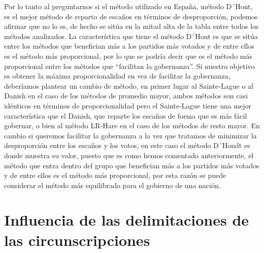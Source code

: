 \documentclass[12pt,a4paper,]{book}
\def\ifdoblecara{} %
\def\ifprincipal{} %
\numberwithin{dummy}{section}
\theoremstyle{ocrenumbox}
\theoremstyle{blacknumex}
\theoremstyle{blacknumbox}
\theoremstyle{ocrenum}
\theoremstyle{ocrenum}
\begin{document}
Por lo tanto al preguntarnos si el método utilizado en España, método
D´Hont, es el mejor método de reparto de escaños en términos de
desproporción, podemos afirmar que no lo es, de hecho se sitúa en la
mitad alta de la tabla entre todos los métodos analizados. La
característica que tiene el método D´Hont es que se sitúa entre los
métodos que benefician más a los partidos más votados y de entre ellos
es el método más proporcional, por lo que se podría decir que es el
método más proporcional entre los métodos que ``facilitan la
gobernanza''. Si nuestro objetivo es obtener la máxima proporcionalidad
en vez de facilitar la gobernanza, deberíamos plantear un cambio de
método, en primer lugar al Sainte-Lague o al Danish en el caso de los
métodos de promedio mayor, ambos métodos son casi idénticos en términos
de proporcionalidad pero el Sainte-Lague tiene una mejor característica
que el Danish, que reparte los escaños de forma que es más fácil
gobernar, o bien al método LR-Hare en el caso de los métodos de resto
mayor. En cambio si queremos facilitar la gobernanza a la vez que
tratamos de minimizar la desproporción entre los escaños y los votos, en
este caso el método D´Hondt es donde muestra su valor, puesto que es
como hemos comentado anteriormente, el método que entra dentro del grupo
que benefician más a los partidos más votados y de entre ellos es el
método más proporcional, por esta razón se puede considerar el método
más equilibrado para el gobierno de una nación.

\FloatBarrier

\ifdefined\ifprincipal
\else
\setlength{\parindent}{1em}
\pagestyle{fancy}
\setcounter{tocdepth}{4}
\tableofcontents

\fi

\ifdefined\ifdoblecara
\fancyhead{}{}
\fancyhead[LE,RO]{\scriptsize\rightmark}
\fancyfoot[LO,RE]{\scriptsize\slshape \leftmark}
\fancyfoot[C]{}
\fancyfoot[LE,RO]{\footnotesize\thepage}
\else
\fancyhead{}{}
\fancyhead[RO]{\scriptsize\rightmark}
\fancyfoot[LO]{\scriptsize\slshape \leftmark}
\fancyfoot[C]{}
\fancyfoot[RO]{\footnotesize\thepage}
\fi
\renewcommand{\headrulewidth}{0.4pt}
\renewcommand{\footrulewidth}{0.4pt}

\hypertarget{influencia-de-las-delimitaciones-de-las-circunscripciones}{%
\chapter{Influencia de las delimitaciones de las
circunscripciones}\label{influencia-de-las-delimitaciones-de-las-circunscripciones}}
\end{document}
